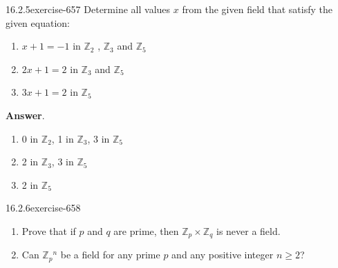 \documentclass[twoside,10pt,]{book}
\numberwithin{equation}{section}
\begin{document}
\begin{divisionsolution}{16.2.5}{}{exercise-657}%
\hypertarget{p-5893}{}%
Determine all values \(x\) from the given field that satisfy the given equation:\leavevmode%
\begin{enumerate}[label=(\alph*)]
\item\hypertarget{li-2602}{}\hypertarget{p-5894}{}%
\(x + 1 = -1\)  in \(\mathbb{Z}_2\) , \(\mathbb{Z}_3\) and \(\mathbb{Z}_5\)%
\item\hypertarget{li-2603}{}\hypertarget{p-5895}{}%
\(2x + 1 = 2\) in \(\mathbb{Z}_3\) and  \(\mathbb{Z}_5\)%
\item\hypertarget{li-2604}{}\hypertarget{p-5896}{}%
\(3x + 1 = 2\)  in \(\mathbb{Z}_5\)%
\end{enumerate}
%
\par\smallskip%
\noindent\textbf{Answer}.\quad%
\hypertarget{p-5897}{}%
\leavevmode%
\begin{enumerate}[label=(\alph*)]
\item\hypertarget{li-2605}{}\hypertarget{p-5898}{}%
0 in \(\mathbb{Z}_2\),  1 in \(\mathbb{Z}_3\),  3 in \(\mathbb{Z}_5\)%
\item\hypertarget{li-2606}{}\hypertarget{p-5899}{}%
2  in \(\mathbb{Z}_3\),  3 in \(\mathbb{Z}_5\)%
\item\hypertarget{li-2607}{}\hypertarget{p-5900}{}%
2 in \(\mathbb{Z}_5\)%
\end{enumerate}
%
\end{divisionsolution}%
\begin{divisionsolution}{16.2.6}{}{exercise-658}%
\hypertarget{p-5901}{}%
\leavevmode%
\begin{enumerate}[label=(\alph*)]
\item\hypertarget{li-2608}{}\hypertarget{p-5902}{}%
Prove that if \(p\) and \(q\) are prime, then \(\mathbb{Z}_p \times  \mathbb{Z}_q\) is never a field.%
\item\hypertarget{li-2609}{}\hypertarget{p-5903}{}%
Can \(\mathbb{Z}_p{}^n\) be a field for any prime \(p\) and any positive integer \(n \geq  2\)?%
\end{enumerate}
%
\end{divisionsolution}%
\end{document}
